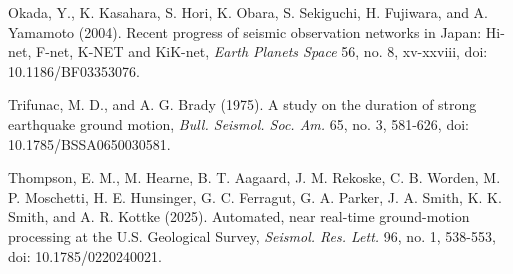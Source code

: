 \documentclass[12pt,letterpaper]{article}
\begin{document}
Okada, Y., K. Kasahara, S. Hori, K. Obara, S. Sekiguchi, H. Fujiwara, and A. Yamamoto (2004). Recent progress of seismic observation networks in Japan: Hi-net, F-net, K-NET and KiK-net, \emph{Earth Planets Space} 56, no. 8, xv-xxviii, doi: 10.1186/BF03353076.

Trifunac, M. D., and A. G. Brady (1975). A study on the duration of strong earthquake ground motion, \emph{Bull. Seismol. Soc. Am.} 65, no. 3, 581-626, doi: 10.1785/BSSA0650030581.

Thompson, E. M., M. Hearne, B. T. Aagaard, J. M. Rekoske, C. B. Worden, M. P. Moschetti, H. E. Hunsinger, G. C. Ferragut, G. A. Parker, J. A. Smith, K. K. Smith, and A. R. Kottke (2025). Automated, near real-time ground-motion processing at the U.S. Geological Survey, \emph{Seismol. Res. Lett.} 96, no. 1, 538-553, doi: 10.1785/0220240021.
\end{document}
